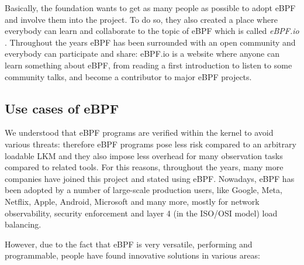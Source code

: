 Basically, the foundation wants to get as many people as possible to adopt eBPF and involve them into the project.
To do so, they also created a place where everybody can learn and collaborate to the topic of eBPF which is called \textit{eBPF.io} \cite{eBPFioWebsite}.
Throughout the years eBPF has been surrounded with an open community and everybody can participate and share: eBPF.io is a website where anyone can learn something about eBPF, from reading a first introduction to listen to some community talks, and become a contributor to major eBPF projects.

\subsection{Use cases of eBPF}

We understood that eBPF programs are verified within the kernel to avoid various threats: therefore eBPF programs pose less risk compared to an arbitrary loadable LKM and they also impose less overhead for many observation tasks compared to related tools.
For this reasons, throughout the years, many more companies have joined this project and stated using eBPF.
Nowadays, eBPF has been adopted by a number of large-scale production users, like Google, Meta, Netflix, Apple, Android, Microsoft and many more, mostly for network observability, security enforcement and layer 4 (in the ISO/OSI model) load balancing.

However, due to the fact that eBPF is very versatile, performing and programmable, people have found innovative solutions in various areas:

